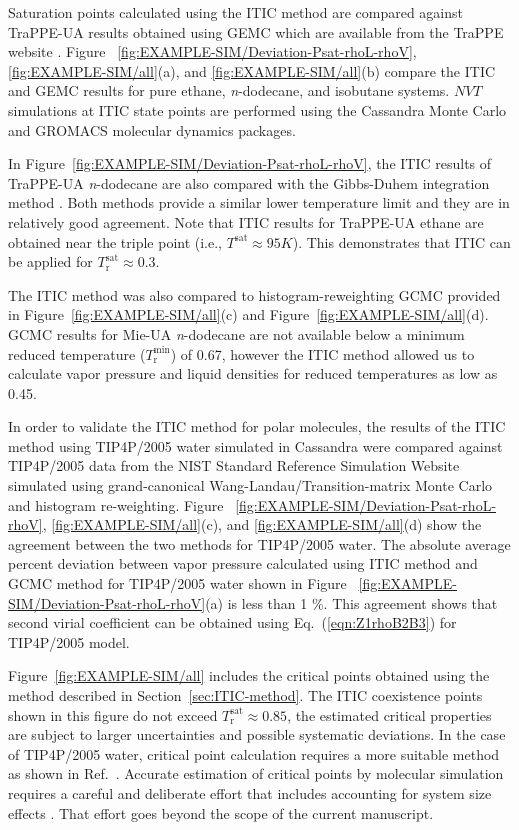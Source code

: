 \documentclass[5p,times]{elsarticle}
\begin{document}
Saturation points calculated using the ITIC method are compared against TraPPE-UA results obtained using GEMC which are available from the TraPPE website \cite{eggimann2014}. Figure~ \ref{fig:EXAMPLE-SIM/Deviation-Psat-rhoL-rhoV}, \ref{fig:EXAMPLE-SIM/all}(a), and \ref{fig:EXAMPLE-SIM/all}(b) compare the ITIC and GEMC results for pure ethane, \textit{n}-dodecane, and isobutane systems. $NVT$ simulations at ITIC state points are performed using the Cassandra Monte Carlo \cite{Shah2017} and GROMACS molecular dynamics \cite{Lindahl2001} packages. 

In Figure~\ref{fig:EXAMPLE-SIM/Deviation-Psat-rhoL-rhoV}, the ITIC results of TraPPE-UA \textit{n}-dodecane are also compared with the Gibbs-Duhem integration method \cite{Ungerer2000}. Both methods provide a similar lower temperature limit and they are in relatively good agreement. Note that ITIC results for TraPPE-UA ethane are obtained near the triple point (i.e., $T^\mathrm{sat} \approx 95 K$). This demonstrates that ITIC can be applied for $T_\mathrm{r}^\mathrm{sat} \approx 0.3$.

The ITIC method was also compared to histogram-reweighting GCMC provided in Figure~\ref{fig:EXAMPLE-SIM/all}(c) and Figure~\ref{fig:EXAMPLE-SIM/all}(d). GCMC results for Mie-UA \textit{n}-dodecane are not available below a minimum reduced temperature ($T_\mathrm{r}^{\mathrm{min}}$) of 0.67, however the ITIC method allowed us to calculate vapor pressure and liquid densities for reduced temperatures as low as 0.45. 

In order to validate the ITIC method for polar molecules, the results of the ITIC method using TIP4P/2005 water simulated in Cassandra were compared against TIP4P/2005 data from the NIST Standard Reference Simulation Website \cite{Shen2008} simulated using grand-canonical Wang-Landau/Transition-matrix Monte Carlo and histogram re-weighting. Figure~ \ref{fig:EXAMPLE-SIM/Deviation-Psat-rhoL-rhoV}, \ref{fig:EXAMPLE-SIM/all}(c), and \ref{fig:EXAMPLE-SIM/all}(d) show the agreement between the two methods for TIP4P/2005 water. The absolute average percent deviation between vapor pressure calculated using ITIC method and GCMC method for TIP4P/2005 water shown in Figure~ \ref{fig:EXAMPLE-SIM/Deviation-Psat-rhoL-rhoV}(a) is less than 1 \%. This agreement shows that second virial coefficient can be obtained using Eq.~(\ref{eqn:Z1rhoB2B3}) for TIP4P/2005 model.

Figure~\ref{fig:EXAMPLE-SIM/all} includes the critical points obtained using the method described in Section~\ref{sec:ITIC-method}. The ITIC coexistence points 
shown in this figure do not exceed $T_\mathrm{r}^\mathrm{sat} \approx 0.85$, the estimated critical properties are subject to larger uncertainties and possible systematic deviations. In the case of TIP4P/2005 water, critical point calculation requires a more suitable method as shown in Ref.~\cite{Vega2006}. Accurate estimation of critical points by molecular simulation requires a careful and deliberate effort that includes accounting for system size effects \cite{orkoulas2001precise}. That effort goes beyond the scope of the current manuscript.
\end{document}
